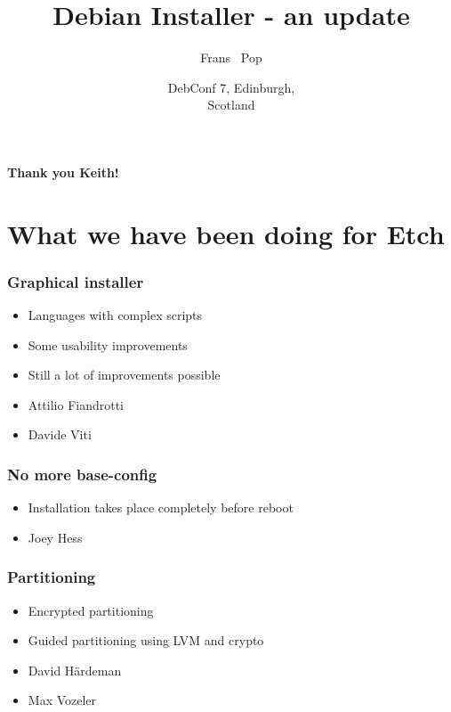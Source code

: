 \documentclass{beamer}
\title
{Debian Installer - an update}
\author
{Frans ~Pop}
\date[Debconf 7] %
{DebConf 7, Edinburgh,\\ Scotland}
\begin{document}
\begin{frame}
\begin{huge}
\color{red}
	\textbf{Thank you Keith!}
\end{huge}
\end{frame}

\begin{frame}
  \titlepage
\end{frame}

\begin{frame}
  \tableofcontents
\end{frame}


\section{What we have been doing for Etch}

\begin{frame}
  \frametitle{Graphical installer}
	\begin{itemize}
	\item
		Languages with complex scripts
	\item
		Some usability improvements
	\item
		Still a lot of improvements possible
	\end{itemize}
	\begin{itemize}
	\item
		Attilio Fiandrotti
	\item
		Davide Viti
	\end{itemize}
\end{frame}

\begin{frame}
  \frametitle{No more base-config}
	\begin{itemize}
	\item
		Installation takes place completely before reboot
	\end{itemize}
	\begin{itemize}
	\item
		Joey Hess
	\end{itemize}
\end{frame}

\begin{frame}
  \frametitle{Partitioning}
	\begin{itemize}
	\item
		Encrypted partitioning
	\item
		Guided partitioning using LVM and crypto
	\end{itemize}
	\begin{itemize}
	\item
		David Härdeman
	\item
		Max Vozeler
	\end{itemize}
\end{frame}
\end{document}
